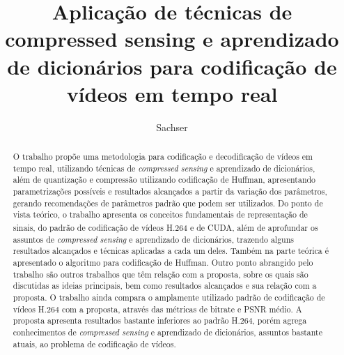 \documentclass[cic,tc]{iiufrgs}
\title{Aplicação de técnicas de compressed sensing e aprendizado de dicionários para codificação de vídeos em tempo real}
\author{Sachser}{Eduardo}
\newcommand{\reg}{\textsuperscript{\textregistered}}
\begin{document}
\maketitle





\begin{abstract}
    O trabalho propõe uma metodologia para codificação e decodificação de 
    vídeos em tempo real, utilizando técnicas de \emph{compressed sensing} e aprendizado 
    de dicionários, além de quantização e compressão utilizando codificação de Huffman, 
    apresentando parametrizações possíveis e resultados alcançados 
    a partir da variação dos parâmetros, gerando recomendações de parâmetros 
    padrão que podem ser utilizados.
    Do ponto de vista teórico, o trabalho apresenta os conceitos fundamentais de representação
    de sinais, do padrão de codificação de vídeos H.264 e de CUDA\reg, além 
    de aprofundar os assuntos de \emph{compressed sensing} e aprendizado de dicionários,
    trazendo alguns resultados alcançados e técnicas aplicadas a cada um deles. 
    Também na parte teórica é apresentado o algoritmo para codificação de Huffman.
    Outro ponto abrangido pelo trabalho são outros trabalhos que têm relação com a proposta,
    sobre os quais são discutidas as ideias principais, bem como resultados alcançados e sua 
    relação com a proposta.
    O trabalho ainda compara o amplamente utilizado padrão de codificação de vídeos H.264
    com a proposta, através das métricas de bitrate e PSNR médio.
    A proposta apresenta resultados bastante inferiores ao padrão H.264, 
    porém agrega conhecimentos
    de \emph{compressed sensing} e aprendizado de dicionários, assuntos bastante atuais, 
    ao problema de codificação de vídeos.
\end{abstract}
\end{document}
